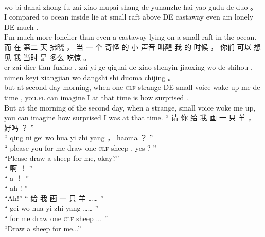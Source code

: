\documentclass[UTF8]{ctexart}
\begin{document}
\begin{exe}
\\
wo bi dahai zhong fu zai xiao mupai shang de yunanzhe hai yao gudu de duo 。
\\
I {compared to} ocean inside lie at small raft above DE castaway even am lonely DE much .
\\
\trans I'm much more lonelier than even a castaway lying on a small raft in the ocean. 
\ex
\glll
而 在 第二 天 拂晓 ， 当 一 个 奇怪 的 小 声音 叫醒 我 的 时候 ， 你们 可以 想见 我 当时 是 多么 吃惊 。
\\
er zai dier tian fuxiao , zai yi ge qiguai de xiao shenyin jiaoxing wo de shihou , nimen keyi xiangjian wo dangshi shi duoma chijing 。
\\
but at second day morning, when one \textsc{clf} strange DE small voice {wake up} me de time , {you.\textsc{pl}} can imagine I {at that time} is how surprised . 
\\
\trans But at the morning of the second day, when a strange, small voice woke me up, you can imagine how surprised I was at that time. 
\ex
\glll
“ 请 你 给 我 画 一 只 羊 ， 好吗 ？ ”
\\
“ qing ni gei wo hua yi zhi yang ， haoma ？ ”
\\
`` please you for me draw one \textsc{clf} sheep , yes ? ''
\\
\trans ``Please draw a sheep for me, okay?''\\
\ex
\glll
“ 啊 ！ ”
\\
“ a ！ ”
\\
`` ah ! ''
\\
\trans ``Ah!''
\ex
\glll
“ 给 我 画 一 只 羊 …… ”
\\
“ gei wo hua yi zhi yang …… ”
\\
`` for me draw one \textsc{clf} sheep ... ''
\\
\trans ``Draw a sheep for me...''
\end{exe}
\end{document}
